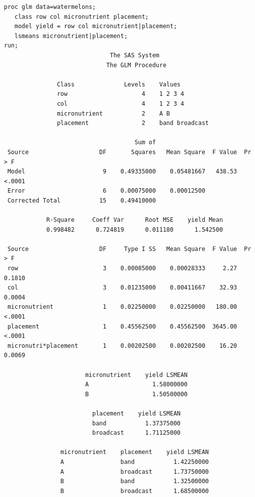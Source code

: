 \newpage
\begin{small}
\begin{verbatim}
proc glm data=watermelons;  
   class row col micronutrient placement;
   model yield = row col micronutrient|placement;
   lsmeans micronutrient|placement;
run;
                              The SAS System                              
                             The GLM Procedure
 
               Class              Levels    Values
               row                     4    1 2 3 4        
               col                     4    1 2 3 4        
               micronutrient           2    A B            
               placement               2    band broadcast 

                                     Sum of
 Source                    DF       Squares   Mean Square  F Value  Pr > F
 Model                      9    0.49335000    0.05481667   438.53  <.0001
 Error                      6    0.00075000    0.00012500                 
 Corrected Total           15    0.49410000                               

            R-Square     Coeff Var      Root MSE    yield Mean
            0.998482      0.724819      0.011180      1.542500

 Source                    DF     Type I SS   Mean Square  F Value  Pr > F
 row                        3    0.00085000    0.00028333     2.27  0.1810
 col                        3    0.01235000    0.00411667    32.93  0.0004
 micronutrient              1    0.02250000    0.02250000   180.00  <.0001
 placement                  1    0.45562500    0.45562500  3645.00  <.0001
 micronutri*placement       1    0.00202500    0.00202500    16.20  0.0069

                       micronutrient    yield LSMEAN
                       A                  1.58000000
                       B                  1.50500000

                         placement    yield LSMEAN
                         band           1.37375000
                         broadcast      1.71125000

                micronutrient    placement    yield LSMEAN
                A                band           1.42250000
                A                broadcast      1.73750000
                B                band           1.32500000
                B                broadcast      1.68500000
\end{verbatim}
\end{small}




















